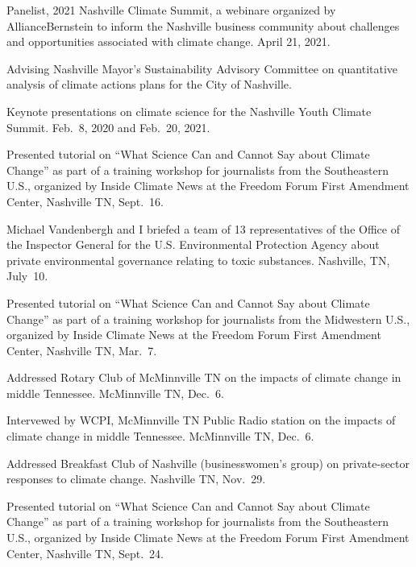 \item[2021] Panelist, 2021 Nashville Climate Summit, a webinare organized by
 AllianceBernstein to inform the Nashville business community about
 challenges and opportunities associated with climate change. April 21, 2021.
\item[2020--present] Advising Nashville Mayor's Sustainability Advisory
  Committee on quantitative analysis of climate actions plans for the City of
  Nashville.
\item[2020--2021] Keynote presentations on climate science for the Nashville
  Youth Climate Summit. Feb.~8, 2020 and Feb.~20, 2021.
\item[2019] Presented tutorial on ``What Science Can and Cannot Say about
  Climate Change'' as part of a training workshop for journalists from the
  Southeastern U.S., organized by Inside Climate News at the Freedom Forum
  First Amendment Center, Nashville TN, Sept.~16.
\item[2019] Michael Vandenbergh and I briefed a team of 13 representatives of
  the Office of the Inspector General for the U.S. Environmental Protection
  Agency about private environmental governance relating to toxic substances.
  Nashville, TN, July~10.
\item[2019] Presented tutorial on ``What Science Can and Cannot Say about
  Climate Change'' as part of a training workshop for journalists from the
  Midwestern U.S., organized by Inside Climate News at the Freedom Forum First
  Amendment Center, Nashville TN, Mar.~7.
\item[2018] Addressed Rotary Club of McMinnville TN on the impacts of climate
  change in middle Tennessee. McMinnville TN, Dec.\ 6.
\item[2018] Intervewed by WCPI, McMinnville TN Public Radio station on the
  impacts of climate change in middle Tennessee. McMinnville TN, Dec.\ 6.
\item[2018] Addressed Breakfast Club of Nashville (businesswomen's group) on
  private-sector responses to climate change. Nashville TN, Nov.\ 29.
\item[2018] Presented tutorial on ``What Science Can and Cannot Say about
  Climate Change'' as part of a training workshop for journalists from the
  Southeastern U.S., organized by Inside Climate News at the Freedom Forum
  First Amendment Center, Nashville TN, Sept.~24.
